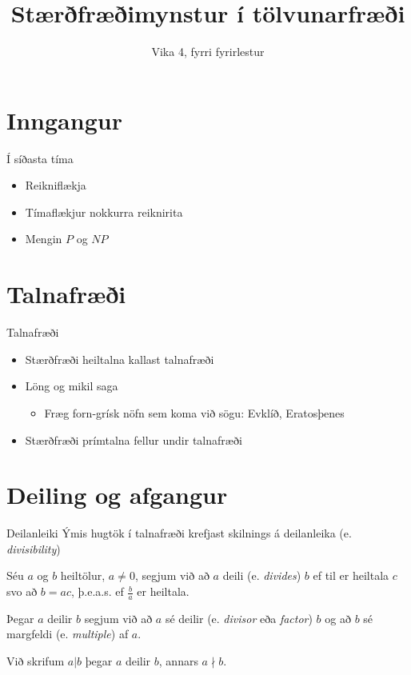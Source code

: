 \documentclass{beamer}
\title{Stærðfræðimynstur í tölvunarfræði}
\subtitle{Vika 4, fyrri fyrirlestur}
\begin{document}
\begin{frame}
\titlepage
\end{frame}


\section{Inngangur}

\begin{frame}{Í síðasta tíma}
\begin{itemize}
 \item Reikniflækja
 \item Tímaflækjur nokkurra reiknirita
 \item Mengin $P$ og $NP$
\end{itemize}
\end{frame}

\section{Talnafræði}

\begin{frame}{Talnafræði}
\begin{itemize}
 \item Stærðfræði heiltalna kallast talnafræði
 \item Löng og mikil saga
 \begin{itemize}
  \item Fræg forn-grísk nöfn sem koma við sögu: Evklíð, Eratosþenes
 \end{itemize}
 \item Stærðfræði prímtalna fellur undir talnafræði
\end{itemize}
\end{frame}

\section{Deiling og afgangur}

\begin{frame}{Deilanleiki}
Ýmis hugtök í talnafræði krefjast skilnings á deilanleika (e. \emph{divisibility})

\begin{tcolorbox}[title=Deilanleiki]
Séu $a$ og $b$ heiltölur, $a \neq 0$, segjum við að $a$ deili (e. \emph{divides}) $b$ ef til er heiltala $c$ svo að $b = ac$, þ.e.a.s. ef $\frac{b}{a}$ er heiltala.

Þegar $a$ deilir $b$ segjum við að $a$ sé deilir (e. \emph{divisor} eða \emph{factor}) $b$ og að $b$ sé margfeldi (e. \emph{multiple}) af $a$.

Við skrifum $a | b$ þegar $a$ deilir $b$, annars $a \nmid b$.
\end{tcolorbox}
\end{frame}
\end{document}
